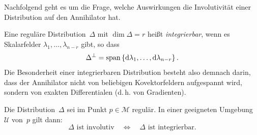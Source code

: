 Nachfolgend geht es um die Frage, welche Auswirkungen die Involutivität
einer Distribution auf den Annihilator hat.
\begin{definition}
\label{def:Integrierbarkeit-Distribution}Eine reguläre Distribution~$\Delta$
mit $\dim\Delta=r$ heißt \emph{integrierbar},
wenn es Skalarfelder $\lambda_{1},\ldots,\lambda_{n-r}$ gibt, so
dass 
\begin{equation}
\Delta^{\perp}={\operatorname{span}}\left\{ {\mathrm{d}}\lambda_{1},\ldots,{\mathrm{d}}\lambda_{n-r}\right\} .\label{eq:Distr-def-integrierbar}
\end{equation}
Die Besonderheit einer integrierbaren Distribution besteht also demnach
darin, dass der Annihilator nicht von beliebigen Kovektorfeldern aufgespannt
wird, sondern von exakten Differentialen (d.\,h. von Gradienten).
\end{definition}
\begin{theorem}
\label{thm:Frobenius-lokal}Die
Distribution~$\Delta$ sei im Punkt $p\in\mathcal{M}$ regulär.
In einer geeigneten Umgebung~$\mathcal{U}$ von~$p$ gilt dann:
\[
\Delta\mbox{ ist involutiv}\quad\Longleftrightarrow\quad\Delta\mbox{ ist integrierbar.}
\]
\end{theorem}

